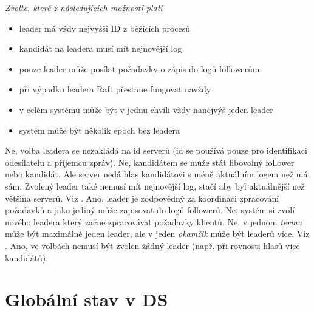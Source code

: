 \documentclass[usenames,dvipsnames,9pt]{beamer}
\begin{document}
{\begin{frame}[fragile]
\vspace{1em}

{\em Zvolte, které z následujících možností platí}

\begin{itemize}
\item leader má vždy nejvyšší ID z běžících procesů 
\item kandidát na leadera musí mít nejnovější log  
\item pouze leader může posílat požadavky o zápis do logů followerům 
\item při výpadku leadera Raft přestane fungovat navždy 
\item v celém systému může být v jednu chvíli vždy nanejvýš jeden leader 
\item systém může být několik epoch bez leadera 
\end{itemize}
\vspace{1em}
\begin{overprint}[\textwidth]
   Ne, volba leadera se nezakládá na id serverů (id se používá pouze pro identifikaci odesílatelu a příjemcu zpráv).
   Ne, kandidátem se může stát libovolný follower nebo kandidát. Ale server nedá hlas kandidátovi s méně aktuálním logem než má sám. Zvolený leader také nemusí mít nejnovější log, stačí aby byl aktuálnější než většina serverů. Viz \href{https://www.cs.princeton.edu/courses/archive/fall16/cos418/papers/raft.pdf}{}.
   Ano, leader je zodpovědný za koordinaci zpracování požadavků a jako jediný může zapisovat do logů followerů. 
   Ne, systém si zvolí nového leadera který začne zpracovávat požadavky klientů. 
   Ne, v jednom \emph{termu} může být maximálně jeden leader, ale v jeden \emph{okamžik} může být leaderů více. Viz \href{http://thesecretlivesofdata.com/raft/}{}.
   Ano, ve volbách nemusí být zvolen žádný leader (např. při rovnosti hlasů více kandidátů).
\end{overprint}
\end{frame}
}

\section{Globální stav v DS}
\end{document}
